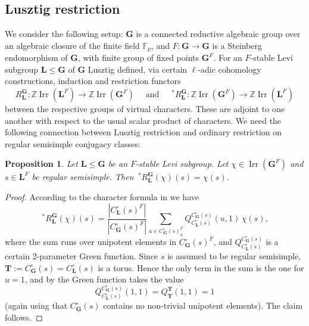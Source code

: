 \documentclass{ert-l}
\newcommand{\FF}{{\mathbb{F}}}
\newcommand{\ZZ}{{\mathbb{Z}}}
\newcommand{\bG}{{\mathbf{G}}}
\newcommand{\bL}{{\mathbf{L}}}
\newcommand{\bT}{{\mathbf{T}}}
\newcommand{\Irr}{{\operatorname{Irr}}}
\newcommand\RLG{{R_\bL^\bG}}
\newcommand\sRLG{{\,{}^*R_\bL^\bG}}
\newtheorem{prop}[thm]{Proposition}
\theoremstyle{definition}
\theoremstyle{remark}
\begin{document}
\subsection{Lusztig restriction}  \label{subsec:*RLG}
We consider the following setup: $\bG$ is a connected reductive algebraic
group over an algebraic closure of the finite field $\FF_p$, and
$F:\bG\rightarrow\bG$ is a Steinberg endomorphism of $\bG$, with finite
group of fixed points $\bG^F$. For an $F$-stable Levi subgroup $\bL\le\bG$
of $\bG$ Lusztig defined, via certain $\ell$-adic cohomology constructions,
induction and restriction functors
$$\RLG:\ZZ\Irr(\bL^F)\rightarrow\ZZ\Irr(\bG^F)\quad\text{ and }\quad
  \sRLG:\ZZ\Irr(\bG^F)\rightarrow\ZZ\Irr(\bL^F)$$
between the respective groups of virtual characters. These are adjoint to one
another with respect to the usual scalar product of characters. We need the
following connection between Lusztig restriction and ordinary restriction on
regular semisimple conjugacy classes:

\begin{prop}   \label{prop:restr}
 Let $\bL\le\bG$ be an $F$-stable Levi subgroup. Let $\chi\in\Irr(\bG^F)$ and
 $s\in \bL^F$ be regular semisimple. Then
 $\sRLG(\chi)(s)=\chi(s)$.
\end{prop}

\begin{proof}
According to the character formula in \cite[Prop.~12.2(ii)]{DM} we have
$$\sRLG(\chi)(s)=\frac{|C_\bL^\circ(s)^F|}{|C_\bG^\circ(s)^F|}
   \sum_{u\in C_\bG^\circ(s)^F_u}Q_{C_\bL^\circ(s)}^{C_\bG^\circ(s)}(u,1)
   \,\chi(s),$$
where the sum runs over unipotent elements in $C_\bG^\circ(s)^F$, and
$Q_{C_\bL^\circ(s)}^{C_\bG^\circ(s)}$ is a certain 2-parameter Green function.
Since $s$ is assumed to be regular semisimple,
$\bT:=C_\bG^\circ(s)=C_\bL^\circ(s)$ is a torus. Hence the only term in the
sum is the one for $u=1$, and by \cite[p.~98]{DM} the Green function takes
the value
$$Q_{C_\bL^\circ(s)}^{C_\bG^\circ(s)}(1,1)=Q_{\bT}^{\bT}(1,1) =1$$
(again using that $C_\bG^\circ(s)$ contains no non-trivial unipotent elements).
The claim follows.
\end{proof}

\end{document}
